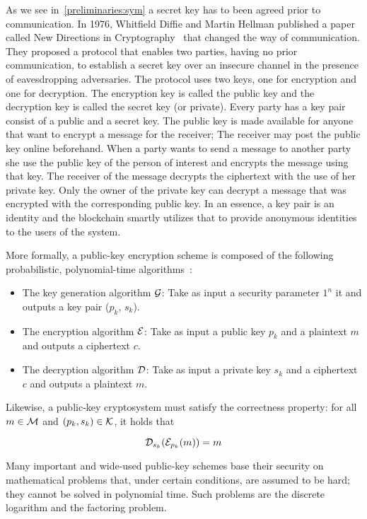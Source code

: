 As we see in~\ref{preliminaries:sym} a secret key has to been agreed prior to communication. In 1976, Whitfield Diffie and Martin Hellman published a paper called New Directions in Cryptography~\cite{Diffie:2006:NDC:2263321.2269104} that changed the way of communication. They proposed a protocol that enables two parties, having no prior communication, to establish a secret key over an insecure channel in the presence of eavesdropping adversaries. The protocol uses two keys, one for encryption and one for decryption. The encryption key is called the public key and the decryption key is called the secret key (or private). Every party has a key pair consist of a public and a secret key. The public key is made available for anyone that want to encrypt a message for the receiver; The receiver may post the public key online beforehand. When a party wants to send a message to another party she use the public key of the person of interest and encrypts the message using that key. The receiver of the message decrypts the ciphertext with the use of her private key. Only the owner of the private key can decrypt a message that was encrypted with the corresponding public key. In an essence, a key pair is an identity and the blockchain smartly utilizes that to provide anonymous identities to the users of the system.

More formally, a public-key encryption scheme is composed of the following probabilistic, polynomial-time algorithms~\cite{Katz:2014:IMC:2700550, kiagias:crypto}:

\begin{itemize}
  \item The key generation algorithm $\mathcal{G}$: Take as input a security parameter $1^{n}$ it and outputs a key pair ($p_k$, $s_k$).
  \item The encryption algorithm $\mathcal{E}$: Take as input a public key $p_k$ and a plaintext $m$ and outputs a ciphertext $c$.
  \item The decryption algorithm $\mathcal{D}$: Take as input a private key $s_k$ and a ciphertext $c$ and outputs a plaintext $m$.
\end{itemize}

Likewise, a public-key cryptosystem must satisfy the correctness property: for all $m \in \mathcal{M}$ and $(p_k, s_k) \in \mathcal{K}$, it holds that

\begin{equation*}
  \mathcal{D}_{s_k}(\mathcal{E}_{p_k}(m)) = m
\end{equation*}

Many important and wide-used public-key schemes base their security on mathematical problems that, under certain conditions, are assumed to be hard; they cannot be solved in polynomial time. Such problems are the discrete logarithm and the factoring problem.

